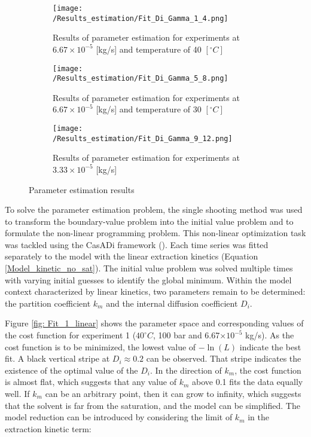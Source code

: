 \documentclass[../Supercritical_fluid_extraction_of_essential_oil_from_chamomile.tex]{subfiles}
\begin{document}
	
	\label{CH: Results}
	
	\begin{figure*}[!h]
		\centering
		\begin{subfigure}{0.3\textwidth}
			\centering
			\texttt{[image: /Results\_estimation/Fit\_Di\_Gamma\_1\_4.png]}
			\caption{Results of parameter estimation for experiments at $6.67\times 10^{-5}$ [kg/s] and temperature of 40 $[^\circ C]$}
			\label{fig: Fit_1_4_Di_Gamma}
		\end{subfigure}
		\hfill
		\begin{subfigure}{0.3\textwidth}
			\centering
			\texttt{[image: /Results\_estimation/Fit\_Di\_Gamma\_5\_8.png]}
			\caption{Results of parameter estimation for experiments at $6.67\times 10^{-5}$ [kg/s] and temperature of 30 $[^\circ C]$}
			\label{fig: Fit_5_8_Di_Gamma}
		\end{subfigure}
		\hfill
		\begin{subfigure}{0.3\textwidth}
			\centering
			\texttt{[image: /Results\_estimation/Fit\_Di\_Gamma\_9\_12.png]}
			\caption{Results of parameter estimation for experiments at $3.33\times 10^{-5}$ [kg/s]}
			\label{fig: Fit_9_12_Di_Gamma}
		\end{subfigure}
		\caption{Parameter estimation results}
		\label{fig: Fit_Di_Gamma}
	\end{figure*}
	
	To solve the parameter estimation problem, the single shooting method was used to transform the boundary-value problem into the initial value problem and to formulate the non-linear programming problem. This non-linear optimization task was tackled using the CasADi framework (\citet{Andersson2018}). Each time series was fitted separately to the model with the linear extraction kinetics (Equation \ref{Model_kinetic_no_sat}). The initial value problem was solved multiple times with varying initial guesses to identify the global minimum. Within the model context characterized by linear kinetics, two parameters remain to be determined: the partition coefficient $k_m$ and the internal diffusion coefficient $D_i$. 
		
	Figure \ref{fig: Fit_1_linear} shows the parameter space and corresponding values of the cost function for experiment 1 ($40^\circ C$, 100 bar and 6.67$\times 10^{-5}$ kg/s). As the cost function is to be minimized, the lowest value of $-\ln(L)$ indicate the best fit. A black vertical stripe at $D_i \approx 0.2$ can be observed. That stripe indicates the existence of the optimal value of the $D_i$. In the direction of $k_m$, the cost function is almost flat, which suggests that any value of $k_m$ above 0.1 fits the data equally well. If $k_m$ can be an arbitrary point, then it can grow to infinity, which suggests that the solvent is far from the saturation, and the model can be simplified. The model reduction can be introduced by considering the limit of $k_m$ in the extraction kinetic term: 
	
\end{document}
